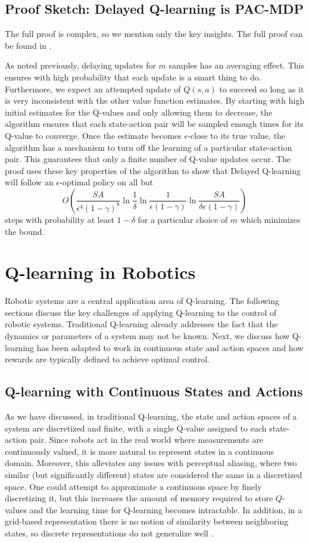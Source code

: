 \documentclass{article} %
\begin{document}
\subsection{Proof Sketch: Delayed Q-learning is PAC-MDP}

The full proof is complex, so we mention only the key insights.  The full proof can be found in \cite{strehl_pac_2006}.  

As noted previously, delaying updates for $m$ samples has an averaging effect.  This ensures with high probability that each update is a smart thing to do.  Furthermore, we expect an attempted update of $Q(s,a)$ to succeed so long as it is very inconsistent with the other value function estimates.  By starting with high initial estimates for the Q-values and only allowing them to decrease, the algorithm ensures that each state-action pair will be sampled enough times for its Q-value to converge.  Once the estimate becomes $\epsilon$-close to its true value, the algorithm has a mechanism to turn off the learning of a particular state-action pair.  This guarantees that only a finite number of Q-value updates occur.  The proof uses these key properties of the algorithm to show that Delayed Q-learning will follow an $\epsilon$-optimal policy on all but $$O\left(\frac{SA}{\epsilon^4(1-\gamma)^8}\ln{\frac{1}{\delta}}\ln{\frac{1}{\epsilon(1-\gamma)}}\ln{\frac{SA}{\delta\epsilon(1-\gamma)}}\right)$$ steps with probability at least $1-\delta$ for a particular choice of $m$ which minimizes the bound.

\section{Q-learning in Robotics}
Robotic systems are a central application area of Q-learning.  The following sections discuss the key challenges of applying Q-learning to the control of robotic systems.  Traditional Q-learning already addresses the fact that the dynamics or parameters of a system may not be known.  Next, we discuss how Q-learning has been adapted to work in continuous state and action spaces and how rewards are typically defined to achieve optimal control. 

\subsection{Q-learning with Continuous States and Actions}
As we have discussed, in traditional Q-learning, the state and action spaces of a system are discretized and finite, with a single Q-value assigned to each state-action pair.  Since robots act in the real world where measurements are continuously valued, it is more natural to represent states in a continuous domain.  Moreover, this alleviates any issues with perceptual aliasing, where two similar (but significantly different) states are considered the same in a discretized space.  One could attempt to approximate a continuous space by finely discretizing it, but this increases the amount of memory required to store $Q$-values and the learning time for Q-learning becomes intractable.  In addition, in a grid-based representation there is no notion of similarity between neighboring states, so discrete representations do not generalize well \cite{gaskett_thesis}.  
\end{document}
